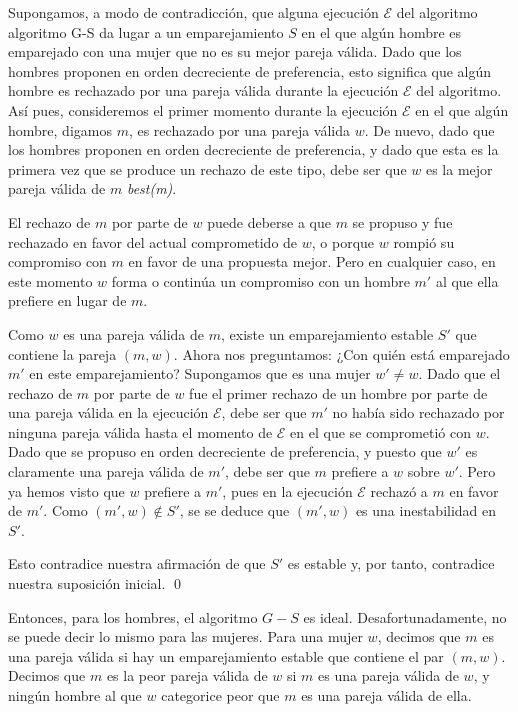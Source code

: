 \documentclass[a4paper, 12pt]{book}
\theoremstyle{dotless}
\renewenvironment{proof}{\vspace{12pt}{\noindent\bfseries Demostración.}}{\qed\vspace{12pt}}
\begin{document}
\begin{proof}
Supongamos, a modo de contradicción, que alguna ejecución $\mathcal{E}$ del algoritmo algoritmo G-S da lugar a un emparejamiento $S$ en el que algún hombre es emparejado con una mujer que no es su mejor pareja válida. Dado que los hombres proponen en orden decreciente de preferencia, esto significa que algún hombre es rechazado por una pareja válida durante la ejecución $\mathcal{E}$ del algoritmo. Así pues, consideremos el primer momento durante la ejecución $\mathcal{E}$ en el que algún hombre, digamos $m$, es rechazado por una pareja válida $w$. De nuevo, dado que los hombres proponen en orden decreciente de preferencia, y dado que esta es la primera vez que se produce un rechazo de este tipo, debe ser que $w$ es la mejor pareja válida de $m$ \textit{best(m)}. 

El rechazo de $m$ por parte de $w$ puede deberse a que $m$ se propuso y fue rechazado en favor del actual comprometido de $w$, o porque $w$ rompió su compromiso con $m$ en favor de una propuesta mejor. Pero en cualquier caso, en este momento $w$ forma o continúa un compromiso con un hombre $m'$ al que ella prefiere en lugar de $m$.

Como $w$ es una pareja válida de $m$, existe un emparejamiento estable $S'$ que contiene la pareja $(m, w)$. 
Ahora nos preguntamos: ¿Con quién está emparejado $m'$ en este emparejamiento? Supongamos que es una mujer $w' \neq w$. 
Dado que el rechazo de $m$ por parte de $w$ fue el primer rechazo de un hombre por parte de una pareja válida en la ejecución $\mathcal{E}$, debe ser que $m'$ no había sido rechazado por ninguna pareja válida hasta el momento de $\mathcal{E}$ en el que se comprometió con $w$. 
Dado que se propuso en orden decreciente de preferencia, y puesto que $w'$ es claramente una pareja válida de $m'$, debe ser que $m$ prefiere a $w$ sobre $w'$. 
Pero ya hemos visto que $w$ prefiere a $m'$, pues en la ejecución $\mathcal{E}$ rechazó a $m$ en favor de $m'$. Como $(m', w) \notin S'$, se se deduce que $(m', w)$ es una inestabilidad en $S'$. 

Esto contradice nuestra afirmación de que $S'$ es estable y, por tanto, contradice nuestra suposición inicial. 
\end{proof}

Entonces, para los hombres, el algoritmo $G-S$ es ideal. Desafortunadamente, no se puede decir lo mismo para las mujeres. Para una mujer $w$, decimos que $m$ es una pareja válida si hay un emparejamiento estable que contiene el par $(m, w)$. Decimos que $m$ es la peor pareja válida de $w$ si $m$ es una pareja válida de $w$, y ningún hombre al que $w$ categorice peor que $m$ es una pareja válida de ella.
\end{document}

